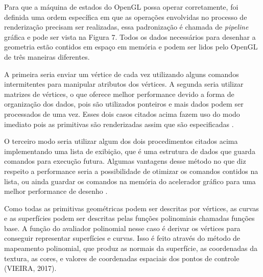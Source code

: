 Para que a máquina de estados do OpenGL possa operar corretamente, foi definida uma ordem específica em que as operações envolvidas no processo de renderização precisam ser realizadas, essa padronização é chamada de \textit{pipeline} gráfica \cite{GLSLBook} e pode ser vista na Figura 7. Todos os dados necessários para desenhar a geometria estão contidos em espaço em memória e podem ser lidos pelo OpenGL de três maneiras diferentes. 

\begin{figure}[h!]
	\centering
\end{figure}
\nocite{pipeline}

A primeira seria enviar um vértice de cada vez utilizando alguns comandos intermitentes para manipular atributos dos vértices. A segunda seria utilizar matrizes de vértices, o que oferece melhor performance devido a forma de organização dos dados, pois são utilizados ponteiros e mais dados podem ser processados de uma vez. Esses dois casos citados acima fazem uso do modo imediato pois as primitivas são renderizadas assim que são especificadas \cite{GLSLBook}. 

O terceiro modo seria utilizar algum dos dois procedimentos citados acima implementando uma lista de exibição, que é uma estrutura de dados que guarda comandos para execução futura. Algumas vantagens desse método no que diz respeito a performance seria a possibilidade de otimizar os comandos contidos na lista, ou ainda guardar os comandos na memória do acelerador gráfico para uma melhor performance de desenho \cite{GLSLBook}. 
	
Como todas as primitivas geométricas podem ser descritas por vértices, as curvas e as superfícies podem ser descritas pelas funções polinomiais chamadas funções base. A função do avaliador polinomial nesse caso é derivar os vértices para conseguir representar superfícies e curvas. Isso é feito através do método de mapeamento polinomial, que produz as normais da superfície, as coordenadas da textura, as cores, e valores de coordenadas espaciais dos pontos de controle (VIEIRA, 2017)\nocite{pipelnRef}.

